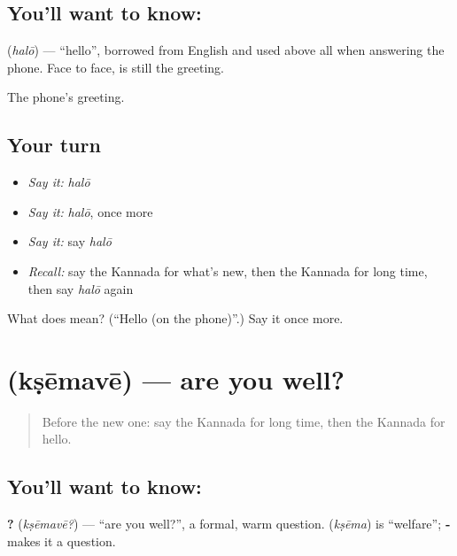 \subsection*{You'll want to know: }
\textbf{} (\emph{halō}) — \textquotedblleft{}hello\textquotedblright{}, borrowed from English and used above all when answering the phone. Face to face, \textbf{} is still the greeting.

\begin{grammarlens}[title={What you've built}]
The phone's greeting.
\end{grammarlens}

\subsection*{Your turn}
\begin{itemize}
\raggedright
  \item \emph{Say it:} \emph{halō}
  \item \emph{Say it:} \emph{halō}, once more
  \item \emph{Say it:} say \emph{halō}
  \item \emph{Recall:} say the Kannada for what's new, then the Kannada for long time, then say \emph{halō} again
\end{itemize}

\begin{tcolorbox}[breakable,colback=teal!4,colframe=teal!35!black,title={Before you move on}]
What does  mean? (\textquotedblleft{}Hello (on the phone)\textquotedblright{}.) Say it once more.
\end{tcolorbox}
\section[\texorpdfstring{\kn{ಕ್ಷೇಮವೇ} (kṣēmavē)}{ಕ್ಷೇಮವೇ (kṣēmavē)}]{ (kṣēmavē) — are you well?}

\label{lesson:KA-C96-wellbeing}



\begin{quote}
Before the new one: say the Kannada for long time, then the Kannada for hello.
\end{quote}

\subsection*{You'll want to know: }
\textbf{?} (\emph{kṣēmavē?}) — \textquotedblleft{}are you well?\textquotedblright{}, a formal, warm question. \textbf{} (\emph{kṣēma}) is \textquotedblleft{}welfare\textquotedblright{}; \textbf{‑} makes it a question.

